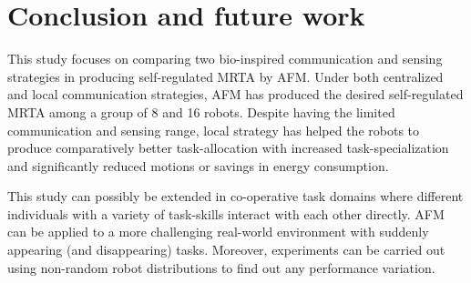 \documentclass[journal]{IEEEtran}
\begin{document}
\section{Conclusion and future work}
\label{sec:conc}
This study focuses on comparing two bio-inspired  communication and sensing strategies in producing self-regulated MRTA by AFM. Under both centralized and local communication strategies, AFM has produced the desired self-regulated MRTA among a group of 8 and 16 robots. Despite having the limited communication and sensing range, local strategy has helped the robots to produce comparatively better task-allocation with increased task-specialization and significantly reduced motions or savings in energy consumption.

This study can possibly be extended in co-operative task domains where different individuals with a variety of task-skills interact with each other directly. AFM can be applied to a more challenging real-world environment with suddenly appearing (and disappearing) tasks.
Moreover,  experiments can be carried out using non-random robot distributions to find out any performance variation.
\end{document}
